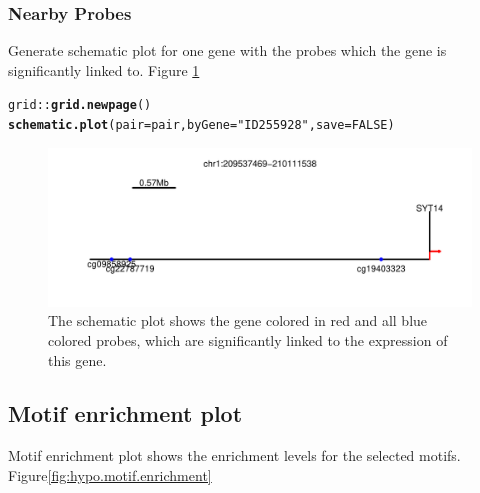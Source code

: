 \documentclass{article}\usepackage[]{graphicx}\usepackage[]{color}
\makeatletter
\def\maxwidth{ %
  \ifdim\Gin@nat@width>\linewidth
    \linewidth
  \else
    \Gin@nat@width
  \fi
}
\newcommand{\hlnum}[1]{\textcolor[rgb]{0.686,0.059,0.569}{#1}}%
\newcommand{\hlstr}[1]{\textcolor[rgb]{0.192,0.494,0.8}{#1}}%
\newcommand{\hlopt}[1]{\textcolor[rgb]{0,0,0}{#1}}%
\newcommand{\hlstd}[1]{\textcolor[rgb]{0.345,0.345,0.345}{#1}}%
\newcommand{\hlkwc}[1]{\textcolor[rgb]{0.333,0.667,0.333}{#1}}%
\newcommand{\hlkwd}[1]{\textcolor[rgb]{0.737,0.353,0.396}{\textbf{#1}}}%
\newenvironment{kframe}{%
 \def\at@end@of@kframe{}%
 \ifinner\ifhmode%
  \def\at@end@of@kframe{\end{minipage}}%
  \begin{minipage}{\columnwidth}%
 \fi\fi%
 \def\FrameCommand##1{\hskip\@totalleftmargin \hskip-\fboxsep
 \colorbox{shadecolor}{##1}\hskip-\fboxsep
     \hskip-\linewidth \hskip-\@totalleftmargin \hskip\columnwidth}%
 \MakeFramed {\advance\hsize-\width
   \@totalleftmargin\z@ \linewidth\hsize
   \@setminipage}}%
 {\par\unskip\endMakeFramed%
 \at@end@of@kframe}
\newenvironment{knitrout}{}{} %
\makeatother
\begin{document}
\subsubsection{Nearby Probes}
Generate schematic plot for one gene with the probes which the gene is significantly 
linked to. Figure \ref{fig:figure5}
\begin{knitrout}
\color{fgcolor}\begin{kframe}
\begin{alltt}
\hlstd{grid}\hlopt{::}\hlkwd{grid.newpage}\hlstd{()}
\hlkwd{schematic.plot}\hlstd{(}\hlkwc{pair}\hlstd{=pair,} \hlkwc{byGene}\hlstd{=}\hlstr{"ID255928"}\hlstd{,} \hlkwc{save}\hlstd{=}\hlnum{FALSE}\hlstd{)}
\end{alltt}
\end{kframe}\begin{figure}
\includegraphics[width=\maxwidth]{figure/figure5-1} \caption[Nearby Probes]{\label{fig:ID255928.schematic.byGene} The schematic plot shows the gene colored in red and all blue colored probes, which are significantly linked to the expression of this gene.}\label{fig:figure5}
\end{figure}


\end{knitrout}

\subsection{Motif enrichment plot}
Motif enrichment plot shows the enrichment levels for the selected motifs. Figure\ref{fig:hypo.motif.enrichment}
\end{document}

